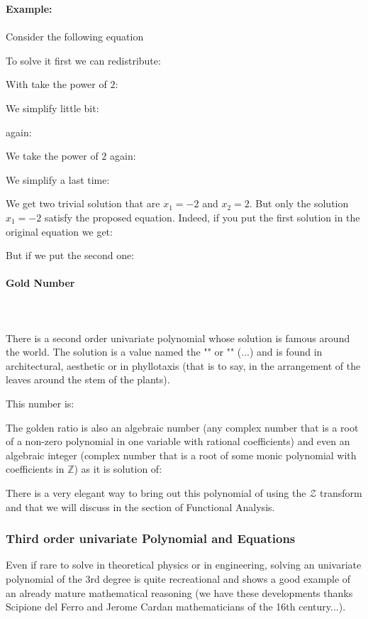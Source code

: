 	\begin{tcolorbox}[colframe=black,colback=white,sharp corners]
	\textbf{{\Large {}}Example:}\\\\
	Consider the following equation
	
	To solve it first we can redistribute:
	
	With take the power of $2$:
	
	We simplify little bit:
	
	again:
	
	We take the power of $2$ again:
	
	We simplify a last time:
	
	We get two trivial solution that are $x_1=-2$ and $x_2=2$. But only the solution $x_1=-2$ satisfy the proposed equation. Indeed, if you put the first solution in the original equation we get:
	
	But if we put the second one:
		
	\end{tcolorbox}
	
	\pagebreak
	\paragraph{Gold Number}\mbox{}\\\\
	There is a second order univariate polynomial whose solution is famous around the world. The solution is a value named the "" or "" (...) and is found in architectural, aesthetic or in phyllotaxis (that is to say, in the arrangement of the leaves around the stem of the plants).
	
	This number is:
	
	The golden ratio is also an algebraic number (any complex number that is a root of a non-zero polynomial in one variable with rational coefficients) and even an algebraic integer (complex number that is a root of some monic polynomial with coefficients in $\mathbb{Z}$) as it is solution of:
	
	There is a very elegant way to bring out this polynomial of using the $\mathcal{Z}$ transform and that we will discuss in the section of Functional Analysis.
	
	\subsubsection{Third order univariate Polynomial and Equations}
	Even if rare to solve in theoretical physics or in engineering, solving an univariate polynomial of the $3$rd degree is quite recreational and shows a good example of an already mature mathematical reasoning (we have these developments thanks Scipione del Ferro and Jerome Cardan mathematicians of the 16th century...).
	
